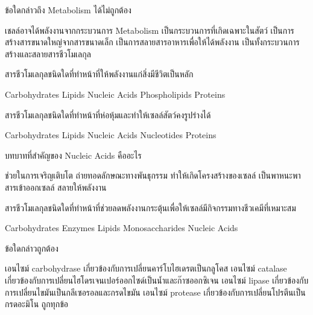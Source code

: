 \begin{questions}
\filbreak
  \question ข้อใดกล่าวถึง Metabolism ได้ไม่ถูกต้อง
  \begin{choices}
    \choice เชลล์อาจได้พลังงานจากกระบวนการ Metabolism
    \choice เป็นกระบวนการที่เกิดเฉพาะในสัตว์
    \choice เป็นการสร้างสารขนาดใหญ่จากสารขนาดเล็ก
    \choice เป็นการสลายสารอาหารเพื่อให้ได้พลังงาน
    \choice เป็นทั้งกระบวนการสร้างและสลายสารชีวโมเลกุล
\end{choices}

\filbreak
  \question สารชีวโมเลกุลชนิดใดที่ทำหน้าที่ให้พลังงานแก่สิ่งมีชีวิตเป็นหลัก
  \begin{choices}
    \choice Carbohydrates
    \choice Lipids
    \choice Nucleic Acids
    \choice Phospholipids
    \choice Proteins
\end{choices}

\filbreak
  \question สารชีวโมเลกุลชนิดใดที่ทำหน้าที่ห่อหุ้มและทำให้เซลล์สัตว์คงรูปร่างได้
  \begin{choices}
    \choice Carbohydrates
    \choice Lipids
    \choice Nucleic Acids
    \choice Nucleotides
    \choice Proteins
\end{choices}

\filbreak
  \question บทบาทที่สำคัญของ Nucleic Acids คืออะไร
  \begin{choices}
    \choice ช่วยในการเจริญเติบโต
    \choice ถ่ายทอดลักษณะทางพันธุกรรม
    \choice ทำให้เกิดโครงสร้างของเซลล์
    \choice เป็นพาหนะพาสารเข้าออกเซลล์
    \choice สลายให้พลังงาน
\end{choices}

\newpage


\filbreak
  \question สารชีวโมเลกุลชนิดใดที่ทำหน้าที่ช่วยลดพลังงานกระตุ้นเพื่อให้เซลล์มีกิจกรรมทางชีวเคมีที่เหมาะสม
  \begin{choices}
    \choice Carbohydrates
    \choice Enzymes
    \choice Lipids
    \choice Monosaccharides
    \choice Nucleic Acids
\end{choices}

\filbreak
  \question ข้อใดกล่าวถูกต้อง
  \begin{choices}
    \choice เอนไซม์ carbohydrase เกี่ยวข้องกับการเปลี่ยนคาร์โบไฮเดรตเป็นกลูโคส
    \choice เอนไซม์ catalase เกี่ยวข้องกับการเปลี่ยนไฮโดรเจนเปอร์ออกไซด์เป็นน้ำและก๊าซออกซิเจน
    \choice เอนไซม์ lipase เกี่ยวข้องกับการเปลี่ยนไขมันเป็นกลีเซอรอลและกรดไขมัน
    \choice เอนไซม์ protease เกี่ยวข้องกับการเปลี่ยนโปรตีนเป็นกรดอะมิโน
    \choice ถูกทุกข้อ
\end{choices}


\end{questions}
